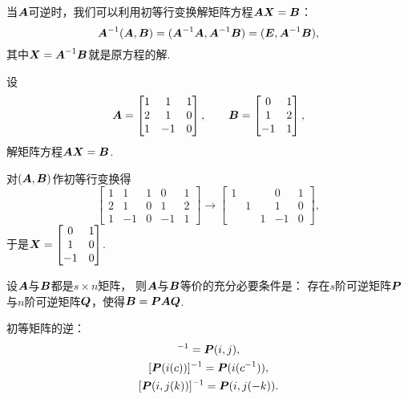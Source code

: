 当\(\boldsymbol{A}\)可逆时，我们可以利用初等行变换解矩阵方程\(\boldsymbol{A} \boldsymbol{X} = \boldsymbol{B}\)：\[
	\boldsymbol{A}^{-1} (\boldsymbol{A},\boldsymbol{B})
	= (\boldsymbol{A}^{-1} \boldsymbol{A},\boldsymbol{A}^{-1} \boldsymbol{B})
	= (\boldsymbol{E},\boldsymbol{A}^{-1} \boldsymbol{B}),
\]
其中\(\boldsymbol{X} = \boldsymbol{A}^{-1} \boldsymbol{B}\)就是原方程的解.
\begin{example}
设\[
	\boldsymbol{A} = \begin{bmatrix}
		1 & 1 & 1 \\
		2 & 1 & 0 \\
		1 & -1 & 0
	\end{bmatrix},
	\qquad
	\boldsymbol{B} = \begin{bmatrix}
		0 & 1 \\
		1 & 2 \\
		-1 & 1
	\end{bmatrix},
\]
解矩阵方程\(\boldsymbol{A} \boldsymbol{X} = \boldsymbol{B}\).
\begin{solution}
对\((\boldsymbol{A},\boldsymbol{B})\)作初等行变换得\[
	\begin{bmatrix}
		1 & 1 & 1 & 0 & 1 \\
		2 & 1 & 0 & 1 & 2 \\
		1 & -1 & 0 & -1 & 1
	\end{bmatrix}
	\to \begin{bmatrix}
		1 & & & 0 & 1 \\
		& 1 & & 1 & 0 \\
		& & 1 & -1 & 0
	\end{bmatrix},
\]
于是\(\boldsymbol{X} = \begin{bmatrix}
	0 & 1 \\
	1 & 0 \\
	-1 & 0
\end{bmatrix}\).
\end{solution}
\end{example}

\begin{theorem}
设\(\boldsymbol{A}\)与\(\boldsymbol{B}\)都是\(s \times n\)矩阵，
则\(\boldsymbol{A}\)与\(\boldsymbol{B}\)等价的充分必要条件是：
存在\(s\)阶可逆矩阵\(\boldsymbol{P}\)与\(n\)阶可逆矩阵\(\boldsymbol{Q}\)，使得\(\boldsymbol{B}=\boldsymbol{P}\boldsymbol{A}\boldsymbol{Q}\).
\end{theorem}

\begin{example}
初等矩阵的逆：\begin{gather*}
	[\vb{P}(i,j)]^{-1}=\vb{P}(i,j), \\
	[\vb{P}(i(c))]^{-1}=\vb{P}(i(c^{-1})), \\
	[\vb{P}(i,j(k))]^{-1}=\vb{P}(i,j(-k)).
\end{gather*}
\end{example}
